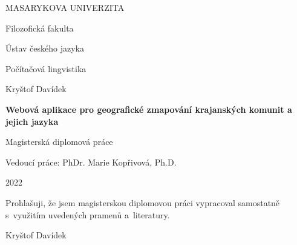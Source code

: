 \documentclass[a4paper,12pt,openany,twoside]{book} %
\begin{document}
	\clearpage

	\begin{titlepage}
		\begin{center}
			{\Large\uppercase{Masarykova univerzita}}

			\vspace{1em}

			{\Large Filozofická fakulta}

			\vspace{1em}

			{\large Ústav českého jazyka}

			\vspace{1em}

			{\large Počítačová lingvistika}

			\vspace{11em}

			{\large Kryštof Davídek }
			
			\vspace{3em}
			
			{\LARGE\bf Webová aplikace pro geografické zmapování krajanských komunit a jejich jazyka}

			\vspace{3em}

			{\Large Magisterská diplomová práce}

			\vfill
			\vspace{3em}
			Vedoucí práce: PhDr. Marie Kopřivová, Ph.D.
			
			2022
		\end{center}
	\end{titlepage}


\cleardoublepage

\par
\par\vspace*{\fill}
	\pagestyle{plain}
\begin{flushright}
	Prohlašuji, že jsem magisterskou diplomovou práci vypracoval samostatně s~využitím uvedených pramenů a~literatury.

	\vspace{3em}

	    \makebox[2.5in][r]{\dotfill}
	    
	    Kryštof Davídek

	    \par

\end{flushright}
\clearpage

\par
\par\vspace*{\fill}
\end{document}
